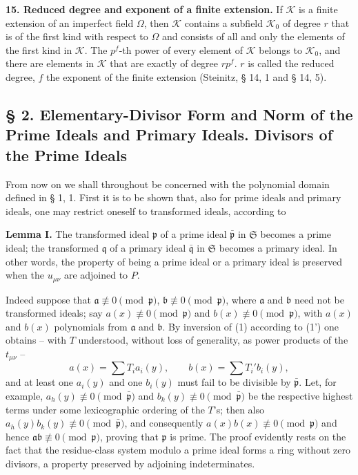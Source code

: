 \documentclass[11pt]{article}
\providecommand{\frakS}{\mathfrak S}
\providecommand{\frakp}{\mathfrak p}
\providecommand{\frakq}{\mathfrak q}
\providecommand{\fraka}{\mathfrak a}
\providecommand{\frakb}{\mathfrak b}
\providecommand{\frakb}{\mathfrak b}
\begin{document}
\textbf{15. Reduced degree and exponent of a finite extension.} If $\mathcal K$ is a finite extension of an imperfect field $\Omega$, then $\mathcal K$ contains a subfield $\mathcal K_0$ of degree $r$ that is of the first kind with respect to $\Omega$ and consists of all and only the elements of the first kind in $\mathcal K$. The $p^f$-th power of every element of $\mathcal K$ belongs to $\mathcal K_0$, and there are elements in $\mathcal K$ that are exactly of degree $rp^f$. $r$ is called the reduced degree, $f$ the exponent of the finite extension (Steinitz, § 14, 1 and § 14, 5).

\subsection*{§ 2. Elementary-Divisor Form and Norm of the Prime Ideals and Primary Ideals. Divisors of the Prime Ideals}

From now on we shall throughout be concerned with the polynomial domain defined in § 1, 1. First it is to be shown that, also for prime ideals and primary ideals, one may restrict oneself to transformed ideals, according to

\textbf{Lemma I.} The transformed ideal $\frakp$ of a prime ideal $\bar{\frakp}$ in $\frakS$ becomes a prime ideal; the transformed $\frakq$ of a primary ideal $\bar{\frakq}$ in $\frakS$ becomes a primary ideal. In other words, the property of being a prime ideal or a primary ideal is preserved when the $u_{\mu\nu}$ are adjoined to $P$.

Indeed suppose that $\fraka\not\equiv0\pmod{\frakp}$, $\frakb\not\equiv0\pmod{\frakp}$, where $\fraka$ and $\frakb$ need not be transformed ideals; say $a(x)\not\equiv0\pmod{\frakp}$ and $b(x)\not\equiv0\pmod{\frakp}$, with $a(x)$ and $b(x)$ polynomials from $\fraka$ and $\frakb$. By inversion of (1) according to (1') one obtains -- with $T$ understood, without loss of generality, as power products of the $t_{\mu\nu}$ --
\[
 a(x)=\sum T_i a_i(y),\qquad b(x)=\sum T_i' b_i(y),
\]
and at least one $a_i(y)$ and one $b_i(y)$ must fail to be divisible by $\bar{\frakp}$. Let, for example, $a_h(y)\not\equiv0\pmod{\bar{\frakp}}$ and $b_k(y)\not\equiv0\pmod{\bar{\frakp}}$ be the respective highest terms under some lexicographic ordering of the $T$'s; then also $a_h(y)b_k(y)\not\equiv0\pmod{\bar{\frakp}}$, and consequently $a(x)b(x)\not\equiv0\pmod{\frakp}$ and hence $\fraka\frakb\not\equiv0\pmod{\frakp}$, proving that $\frakp$ is prime. The proof evidently rests on the fact that the residue-class system modulo a prime ideal forms a ring without zero divisors, a property preserved by adjoining indeterminates.
\end{document}

